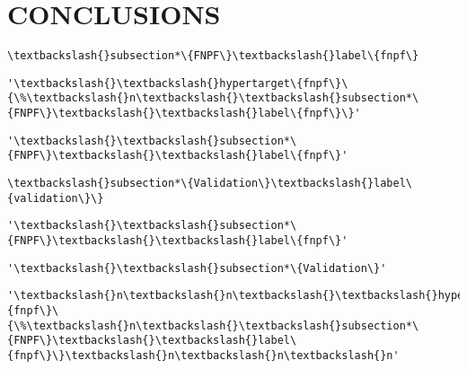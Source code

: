 \section*{CONCLUSIONS}\label{conclusions}
\begin{Verbatim}[commandchars=\\\{\}]
\textbackslash{}subsection*\{FNPF\}\textbackslash{}label\{fnpf\}
\end{Verbatim}
\begin{tcolorbox}[breakable, size=fbox, boxrule=.5pt, pad at break*=1mm, opacityfill=0]
\begin{Verbatim}[commandchars=\\\{\}]
'\textbackslash{}\textbackslash{}hypertarget\{fnpf\}\{\%\textbackslash{}n\textbackslash{}\textbackslash{}subsection*\{FNPF\}\textbackslash{}\textbackslash{}label\{fnpf\}\}'
\end{Verbatim}
\end{tcolorbox}
\begin{tcolorbox}[breakable, size=fbox, boxrule=.5pt, pad at break*=1mm, opacityfill=0]
\begin{Verbatim}[commandchars=\\\{\}]
'\textbackslash{}\textbackslash{}subsection*\{FNPF\}\textbackslash{}\textbackslash{}label\{fnpf\}'
\end{Verbatim}
\end{tcolorbox}
\begin{Verbatim}[commandchars=\\\{\}]
\textbackslash{}subsection*\{Validation\}\textbackslash{}label\{validation\}\}
\end{Verbatim}
\begin{tcolorbox}[breakable, size=fbox, boxrule=.5pt, pad at break*=1mm, opacityfill=0]
\begin{Verbatim}[commandchars=\\\{\}]
'\textbackslash{}\textbackslash{}subsection*\{FNPF\}\textbackslash{}\textbackslash{}label\{fnpf\}'
\end{Verbatim}
\end{tcolorbox}
\begin{tcolorbox}[breakable, size=fbox, boxrule=.5pt, pad at break*=1mm, opacityfill=0]
\begin{Verbatim}[commandchars=\\\{\}]
'\textbackslash{}\textbackslash{}subsection*\{Validation\}'
\end{Verbatim}
\end{tcolorbox}
\begin{tcolorbox}[breakable, size=fbox, boxrule=.5pt, pad at break*=1mm, opacityfill=0]
\begin{Verbatim}[commandchars=\\\{\}]
'\textbackslash{}n\textbackslash{}n\textbackslash{}\textbackslash{}hypertarget\{fnpf\}\{\%\textbackslash{}n\textbackslash{}\textbackslash{}subsection*\{FNPF\}\textbackslash{}\textbackslash{}label\{fnpf\}\}\textbackslash{}n\textbackslash{}n\textbackslash{}n'
\end{Verbatim}
\end{tcolorbox}
